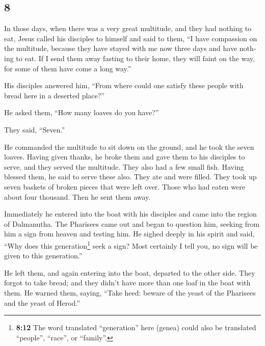 \begin{paracol}{2}
\switchcolumn
\begin{otherlanguage}{english}

\hypertarget{section-15}{%
\section{8}\label{section-15}}

 In those days, when there was a very great multitude, and
they had nothing to eat, Jesus called his disciples to himself and said
to them,  ``I have compassion on the multitude, because
they have stayed with me now three days and have nothing to eat.
 If I send them away fasting to their home, they will
faint on the way, for some of them have come a long way.''

 His disciples answered him, ``From where could one
satisfy these people with bread here in a deserted place?''

 He asked them, ``How many loaves do you have?''

They said, ``Seven.''

 He commanded the multitude to sit down on the ground, and
he took the seven loaves. Having given thanks, he broke them and gave
them to his disciples to serve, and they served the multitude.
 They also had a few small fish. Having blessed them, he
said to serve these also.  They ate and were filled. They
took up seven baskets of broken pieces that were left over.
 Those who had eaten were about four thousand. Then he
sent them away.

 Immediately he entered into the boat with his disciples
and came into the region of Dalmanutha.  The Pharisees
came out and began to question him, seeking from him a sign from heaven
and testing him.  He sighed deeply in his spirit and
said, ``Why does this generation\footnote{\textbf{8:12} The word
  translated ``generation'' here (genea) could also be translated
  ``people'', ``race'', or ``family''.} seek a sign? Most certainly I
tell you, no sign will be given to this generation.''

 He left them, and again entering into the boat, departed
to the other side.  They forgot to take bread; and they
didn't have more than one loaf in the boat with them.  He
warned them, saying, ``Take heed: beware of the yeast of the Pharisees
and the yeast of Herod.''


\end{otherlanguage}
\end{paracol}

